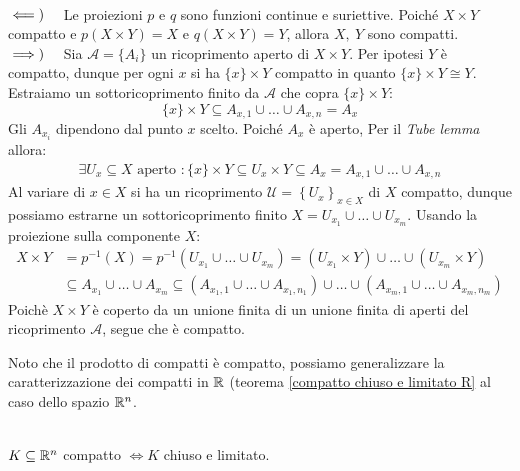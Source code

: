 \begin{demonstration}~{}\\
	$\impliedby)\quad $ Le proiezioni $p$ e $q$ sono funzioni continue e suriettive. Poiché $X\times Y$ compatto e $p\left(X\times Y\right)=X$ e $q\left(X\times Y\right)=Y$, allora $X,\ Y$ sono compatti. \\
	$\implies)\quad $ Sia $\mathcal{A}=\{A_i\}$ un ricoprimento aperto di $X\times Y$. Per ipotesi $Y$ è compatto, dunque per ogni $x$ si ha $\{x\}\times Y$ compatto in quanto $\{x\}\times Y\cong Y$.
	Estraiamo un sottoricoprimento finito da $\mathcal{A}$ che copra $\{x\}\times Y$:
	\begin{equation*}
		\{x\}\times Y\subseteq A_{x,1}\cup\ldots\cup A_{x,n}=A_x
	\end{equation*}
	Gli $A_{x_i}$ dipendono dal punto $x$ scelto. Poiché $A_x$ è aperto, Per il \textit{Tube lemma} allora:
		\begin{gather*}
			\exists U_x\subseteq X \text{ aperto }\colon \{ x\}\times Y \subseteq U_x\times Y \subseteq A_x=A_{x,1}\cup\ldots\cup A_{x,n}
		\end{gather*}
	Al variare di $x\in X$ si ha un ricoprimento $\mathcal{U}=\left\{U_x\right\}_{x\in X}$ di $X$ compatto, dunque possiamo estrarne un sottoricoprimento finito $X=U_{x_1}\cup\ldots\cup U_{x_m}$. Usando la proiezione sulla componente $X$:
		\begin{equation*}
			\begin{array}{ll}
				X\times Y &= p^{-1}(X)=p^{-1}\left( U_{x_1}\cup\ldots\cup U_{x_m}\right)= (U_{x_1}\times Y)\cup\ldots\cup (U_{x_m}\times Y)\\ &\subseteq A_{x_1}\cup\ldots\cup A_{x_m} 
				\subseteq \left( A_{x_1 , 1}\cup\ldots\cup A_{x_1, n_1}\right) \cup\ldots\cup \left( A_{x_m, 1}\cup\ldots\cup A_{x_m, n_m} \right)
			\end{array}
		\end{equation*}
	Poichè $X\times Y$ è coperto da un unione finita di un unione finita di aperti del ricoprimento $\mathcal{A}$, segue che è compatto.
\end{demonstration}
Noto che il prodotto di compatti è compatto, possiamo generalizzare la caratterizzazione dei compatti in $\mathbb{R}$ (teorema \ref{compatto chiuso e limitato R} al caso dello spazio $\mathbb{R} ^n$.
\begin{theorema}~{}\label{compatto chiuso e limitato R^n}\\
$K\subseteq \mathbb{R}^n$ compatto $\iff K$ chiuso e limitato.
\end{theorema}
